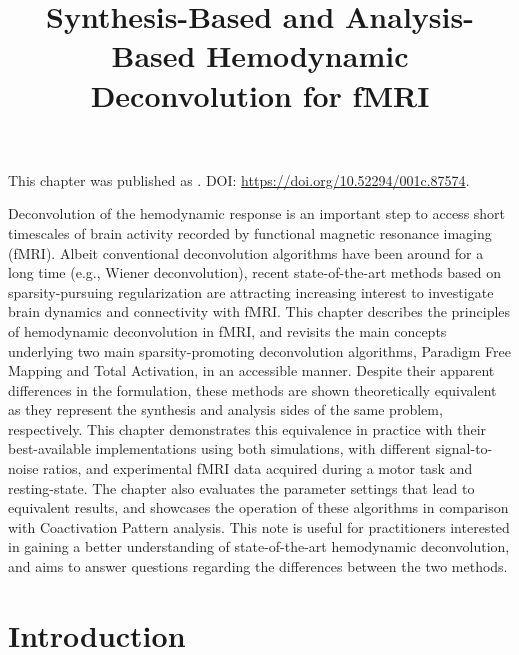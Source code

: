 \title{Synthesis-Based and Analysis-Based Hemodynamic Deconvolution for fMRI}
\label{cha:synthesis_analysis}

\begin{framed}\noindent This chapter was published as
. DOI:
\url{https://doi.org/10.52294/001c.87574}.
\end{framed}

Deconvolution of the hemodynamic response is an important step to access short
timescales of brain activity recorded by functional magnetic resonance imaging
(fMRI). Albeit conventional deconvolution algorithms have been around for a long
time (e.g., Wiener deconvolution), recent state-of-the-art methods based on
sparsity-pursuing regularization are attracting increasing interest to
investigate brain dynamics and connectivity with fMRI. This chapter describes
the principles of hemodynamic deconvolution in fMRI, and revisits the main
concepts underlying two main sparsity-promoting deconvolution algorithms,
Paradigm Free Mapping and Total Activation, in an accessible manner. Despite their
apparent differences in the formulation, these methods are shown theoretically
equivalent as they represent the synthesis and analysis sides of the same
problem, respectively. This chapter demonstrates this equivalence in practice
with their best-available implementations using both simulations, with different
signal-to-noise ratios, and experimental fMRI data acquired during a motor task
and resting-state. The chapter also evaluates the parameter settings that lead
to equivalent results, and showcases the operation of these algorithms in
comparison with Coactivation Pattern analysis. This note is useful for practitioners
interested in gaining a better understanding of state-of-the-art hemodynamic
deconvolution, and aims to answer questions regarding the differences between
the two methods.

\section{Introduction}
\label{sec:synthesis_introduction}

